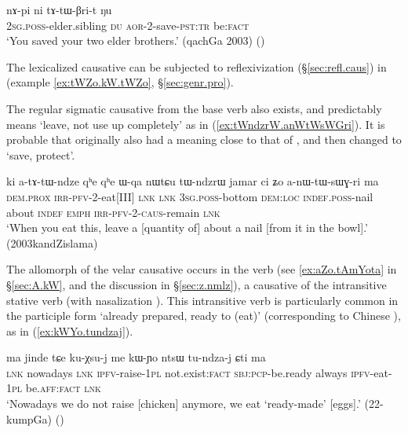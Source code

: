 \begin{exe}
\ex \label{ex:tatWBrit}
 \gll nɤ-pi ni tɤ-tɯ-βri-t ŋu \\
\textsc{2sg}.\textsc{poss}-elder.sibling \textsc{du} \textsc{aor}-2-save-\textsc{pst}:\textsc{tr} be:\textsc{fact} \\
\glt `You saved your two elder brothers.' (qachGa 2003)
()
\end{exe}

The lexicalized causative  can be subjected to reflexivization (§\ref{sec:refl.caus}) in  (example \ref{ex:tWZo.kW.tWZo}, §\ref{sec:genr.pro}). 

The regular sigmatic causative  from the base verb  also exists, and  predictably means  `leave, not use up completely' as in (\ref{ex:tWndzrW.anWtWsWGri}). It is probable that  originally also had a meaning close to that of , and then changed to `save, protect'.   
 
\begin{exe}
\ex \label{ex:tWndzrW.anWtWsWGri}
 \gll ki a-tɤ-tɯ-ndze qʰe qʰe ɯ-qa nɯtɕu tɯ-ndzrɯ jamar ci ʑo a-nɯ-tɯ-sɯɣ-ri ma \\
 \textsc{dem}.\textsc{prox} \textsc{irr}-\textsc{pfv}-2-eat[III] \textsc{lnk} \textsc{lnk} \textsc{3sg}.\textsc{poss}-bottom \textsc{dem}:\textsc{loc} \textsc{indef}.\textsc{poss}-nail about \textsc{indef} \textsc{emph}  \textsc{irr}-\textsc{pfv}-2-\textsc{caus}-remain \textsc{lnk} \\
\glt `When you eat this, leave a [quantity of] about a nail [from it in the bowl].' (2003kandZislama)
\end{exe}
 
The  allomorph of the velar causative occurs in the verb  (see \ref{ex:aZo.tAmYota} in §\ref{sec:A.kW}, and the discussion in §\ref{sec:z.nmlz}), a causative of the intransitive stative verb  (with nasalization  \fl{} ). This  intransitive verb is particularly common in the participle form  `already prepared, ready to (eat)' (corresponding to Chinese ), as in (\ref{ex:kWYo.tundzaj}).  

\begin{exe}
\ex \label{ex:kWYo.tundzaj}
 \gll ma jinde tɕe ku-χsu-j me kɯ-ɲo ntsɯ tu-ndza-j ɕti ma \\
 \textsc{lnk} nowadays \textsc{lnk} \textsc{ipfv}-raise-\textsc{1pl} not.exist:\textsc{fact} \textsc{sbj}:\textsc{pcp}-be.ready always \textsc{ipfv}-eat-\textsc{1pl} be.\textsc{aff}:\textsc{fact} \textsc{lnk} \\
 \glt `Nowadays we do not raise [chicken] anymore, we eat `ready-made' [eggs].'  (22-kumpGa)
()
 \end{exe}
 
